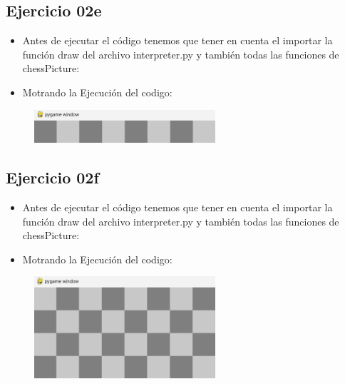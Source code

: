 \documentclass{article}
\begin{document}
	\subsection{Ejercicio 02e}
	\begin{itemize}	
		\item Antes de ejecutar el código tenemos que tener en cuenta el importar la función draw del archivo interpreter.py y también todas las funciones de chessPicture:
	\end{itemize}	
	
		

	\begin{itemize}	
		\item Motrando la Ejecución del codigo:
	\end{itemize}	
	
	\begin{figure}[H]
		\centering
		\includegraphics[width=0.6\textwidth,keepaspectratio]{img/Ejercicio2e.png}
	\end{figure}

	\subsection{Ejercicio 02f}
	\begin{itemize}	
		\item Antes de ejecutar el código tenemos que tener en cuenta el importar la función draw del archivo interpreter.py y también todas las funciones de chessPicture:
	\end{itemize}	
	
		

	\begin{itemize}	
		\item Motrando la Ejecución del codigo:
	\end{itemize}	
	
	\begin{figure}[H]
		\centering
		\includegraphics[width=0.6\textwidth,keepaspectratio]{img/Ejercicio2f.png}
	\end{figure}
\end{document}
